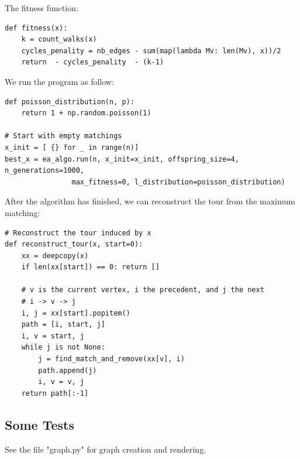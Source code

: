 \documentclass{article}
\begin{document}
The fitness function:
\begin{verbatim}
def fitness(x):
	k = count_walks(x)
	cycles_penality = nb_edges - sum(map(lambda Mv: len(Mv), x))/2  
	return  - cycles_penality  - (k-1)
\end{verbatim}

We run the program as follow:
\begin{verbatim}
def poisson_distribution(n, p):
    return 1 + np.random.poisson(1)  
		
# Start with empty matchings
x_init = [ {} for _ in range(n)]
best_x = ea_algo.run(n, x_init=x_init, offspring_size=4, n_generations=1000, 
				max_fitness=0, l_distribution=poisson_distribution)
\end{verbatim}


After the algorithm has finished, we can reconstruct the tour from the maximum matching:

\begin{verbatim}
# Reconstruct the tour induced by x
def reconstruct_tour(x, start=0):
    xx = deepcopy(x)
    if len(xx[start]) == 0: return []
    
    # v is the current vertex, i the precedent, and j the next
    # i -> v -> j
    i, j = xx[start].popitem()
    path = [i, start, j]
    i, v = start, j
    while j is not None:
        j = find_match_and_remove(xx[v], i)
        path.append(j)
        i, v = v, j
    return path[:-1]  
\end{verbatim}

\subsection{Some Tests}

See the file "graph.py" for graph creation and rendering.
\end{document}
